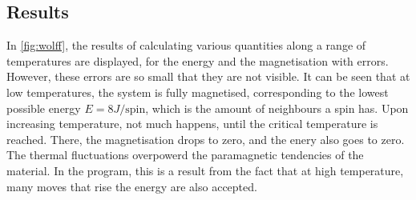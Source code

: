 \documentclass[a4paper]{article}
\begin{document}
\subsection{Results}
In \autoref{fig:wolff}, the results of calculating various quantities along a range of temperatures are displayed, for the energy and the magnetisation with errors. However, these errors are so small that they are not visible. It can be seen that at low temperatures, the system is fully magnetised, corresponding to the lowest possible energy $E=8J/\text{spin}$, which is the amount of neighbours a spin has. Upon increasing temperature, not much happens, until the critical temperature is reached. There, the magnetisation drops to zero, and the enery also goes to zero. The thermal fluctuations overpowerd the paramagnetic tendencies of the material. In the program, this is a result from the fact that at high temperature, many moves that rise the energy are also accepted.
\end{document}
